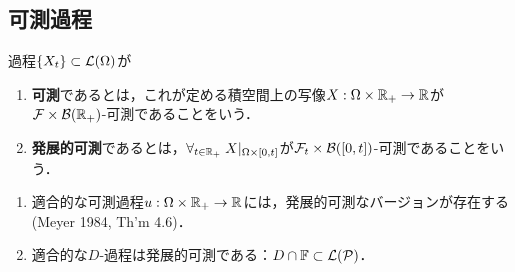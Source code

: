 \documentclass[uplatex,dvipdfmx]{jsreport}
\begin{document}
\subsection{可測過程}

\begin{definition}
    過程$\{X_t\}\subset\mathcal{L}(\Omega)$が
    \begin{enumerate}
        \item \textbf{可測}であるとは，これが定める積空間上の写像$X:\Omega\times\mathbb{R}_+\to\mathbb{R}$が$\mathcal{F}\times\mathcal{B}(\mathbb{R}_+)$-可測であることをいう．
        \item \textbf{発展的可測}であるとは，$\forall_{t\in\mathbb{R}_+}\;X|_{\Omega\times[0,t]}$が$\mathcal{F}_t\times\mathcal{B}([0,t])$-可測であることをいう．
    \end{enumerate}
\end{definition}

\begin{lemma}[発展的可測性の十分条件]\mbox{}
    \begin{enumerate}
        \item 適合的な可測過程$u:\Omega\times\mathbb{R}_+\to\mathbb{R}$には，発展的可測なバージョンが存在する(Meyer 1984, Th'm 4.6)．
        \item 適合的な$D$-過程は発展的可測である：$D\cap\mathbb{F}\subset\mathcal{L}(\mathcal{P})$．
    \end{enumerate}
\end{lemma}
\end{document}
